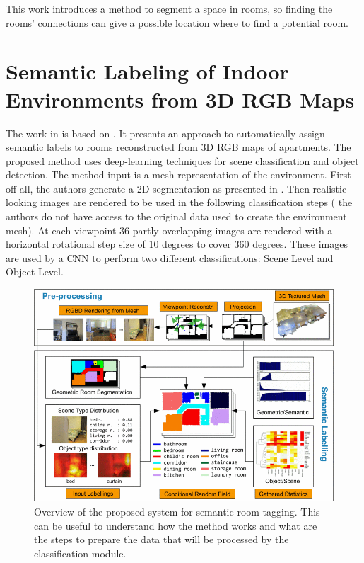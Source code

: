 This work introduces a method to segment a space in rooms, so finding the rooms' connections can give a possible location where to find a potential room. 

\newpage

\section{Semantic Labeling of Indoor Environments from 3D RGB Maps \cite{8462922}}
The work in \cite{8462922} is based on \cite{7814251}. It presents an approach to automatically assign semantic labels to rooms reconstructed from 3D RGB maps of apartments. The proposed method uses deep-learning techniques for scene classification and object detection. The method input is a mesh representation of the environment. First off all, the authors generate a 2D segmentation as presented in \cite{7814251}. Then realistic-looking images are rendered to be used in the following classification steps ( the authors do not have access to the original data used to create the environment mesh). At each viewpoint 36 partly overlapping images are rendered with a horizontal rotational step size of 10 degrees to cover 360 degrees. These images are used by a CNN to perform two different classifications: Scene Level and Object Level. 

\begin{figure}[h!]
	\centering
	\includegraphics[width=0.9\linewidth]{images/semantic_label_overview.png}
	\caption{Overview of the proposed system for semantic room tagging. This can be useful to understand how the method works and what are the steps to prepare the data that will be processed by the classification module.}
\end{figure}

